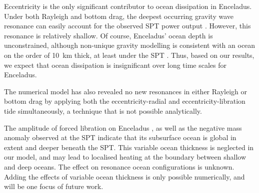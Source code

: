Eccentricity is the only significant contributor to ocean dissipation in Enceladus. Under both Rayleigh and bottom drag, the deepest occurring gravity wave resonance can easily account for the observed SPT power output \citep{spencer2006cassini}. However, this resonance is relatively shallow. Of course, Enceladus' ocean depth is unconstrained, although non-unique gravity modelling is consistent with an ocean on the order of \SI{10}{\kilo\metre} thick, at least under the SPT \citep{iess2014gravity}. Thus, based on our results, we expect that ocean dissipation is insignificant over long time scales for Enceladus. 

The numerical model has also revealed no new resonances in either Rayleigh or bottom drag by applying both the eccentricity-radial and eccentricity-libration tide simultaneously, a technique that is not possible analytically.

The amplitude of forced libration on Enceladus \citep{thomas2015enceladus}, as well as the negative mass anomaly observed at the SPT \citep{iess2014gravity, mckinnon2015effect} indicate that its subsurface ocean is global in extent and deeper beneath the SPT. This variable ocean thickness is neglected in our model, and may lead to localised heating at the boundary between shallow and deep oceans. The effect on resonance ocean configurations is unknown. Adding the effects of variable ocean thickness is only possible numerically, and will be one focus of future work.


